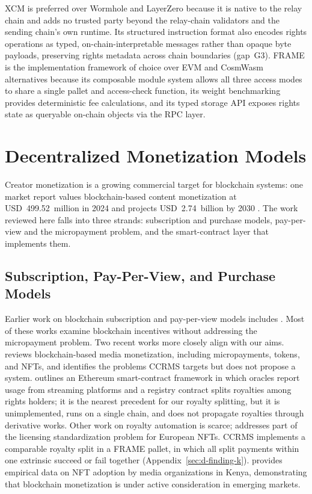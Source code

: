 XCM is preferred over Wormhole and LayerZero because it is native to the relay chain and adds no trusted party beyond the relay-chain validators and the sending chain's own runtime. Its structured instruction format also encodes rights operations as typed, on-chain-interpretable messages rather than opaque byte payloads, preserving rights metadata across chain boundaries (gap~G3). FRAME is the implementation framework of choice over EVM and CosmWasm alternatives because its composable module system allows all three access modes to share a single pallet and access-check function, its weight benchmarking provides deterministic fee calculations, and its typed storage API exposes rights state as queryable on-chain objects via the RPC layer.

\section{Decentralized Monetization Models}\label{sec:decentralized-monetization}

Creator monetization is a growing commercial target for blockchain systems: one market report values blockchain-based content monetization at USD~499.52~million in 2024 and projects USD~2.74~billion by 2030 \citep{threeSixtyIResearch2025}. The work reviewed here falls into three strands: subscription and purchase models, pay-per-view and the micropayment problem, and the smart-contract layer that implements them.

\subsection{Subscription, Pay-Per-View, and Purchase Models}\label{subsec:subscription-ppv-purchase}

Earlier work on blockchain subscription and pay-per-view models includes \citet{munson2019, steem2025, banerjeeEtAl2020}. Most of these works examine blockchain incentives without addressing the micropayment problem. Two recent works more closely align with our aims. \citet{osemwegie2025} reviews blockchain-based media monetization, including micropayments, tokens, and NFTs, and identifies the problems CCRMS targets but does not propose a system. \citet{shah2025} outlines an Ethereum smart-contract framework in which oracles report usage from streaming platforms and a registry contract splits royalties among rights holders; it is the nearest precedent for our royalty splitting, but it is unimplemented, runs on a single chain, and does not propagate royalties through derivative works. Other work on royalty automation is scarce; \citet{reggianini2025} addresses part of the licensing standardization problem for European NFTs. CCRMS implements a comparable royalty split in a FRAME pallet, in which all split payments within one extrinsic succeed or fail together (Appendix~\ref{sec:d-finding-k}). \citet{wamugo2024} provides empirical data on NFT adoption by media organizations in Kenya, demonstrating that blockchain monetization is under active consideration in emerging markets.

